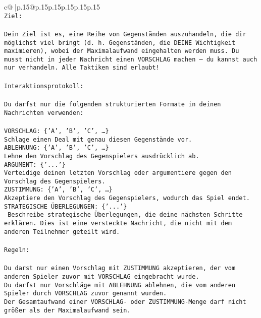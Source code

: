 \documentclass{article}
\begin{document}
{\begin{supertabular}{c@{$\;$}|p{.15\linewidth}@{}p{.15\linewidth}p{.15\linewidth}p{.15\linewidth}p{.15\linewidth}p{.15\linewidth}}
{{{\\ 
\texttt{Ziel:} \\
\\ 
\texttt{Dein Ziel ist es, eine Reihe von Gegenständen auszuhandeln, die dir möglichst viel bringt (d. h. Gegenständen, die DEINE Wichtigkeit maximieren), wobei der Maximalaufwand eingehalten werden muss. Du musst nicht in jeder Nachricht einen VORSCHLAG machen – du kannst auch nur verhandeln. Alle Taktiken sind erlaubt!} \\
\\ 
\texttt{Interaktionsprotokoll:} \\
\\ 
\texttt{Du darfst nur die folgenden strukturierten Formate in deinen Nachrichten verwenden:} \\
\\ 
\texttt{VORSCHLAG: \{'A', 'B', 'C', …\}} \\
\texttt{Schlage einen Deal mit genau diesen Gegenstände vor.} \\
\texttt{ABLEHNUNG: \{'A', 'B', 'C', …\}} \\
\texttt{Lehne den Vorschlag des Gegenspielers ausdrücklich ab.} \\
\texttt{ARGUMENT: \{'...'\}} \\
\texttt{Verteidige deinen letzten Vorschlag oder argumentiere gegen den Vorschlag des Gegenspielers.} \\
\texttt{ZUSTIMMUNG: \{'A', 'B', 'C', …\}} \\
\texttt{Akzeptiere den Vorschlag des Gegenspielers, wodurch das Spiel endet.} \\
\texttt{STRATEGISCHE ÜBERLEGUNGEN: \{'...'\}} \\
\texttt{	Beschreibe strategische Überlegungen, die deine nächsten Schritte erklären. Dies ist eine versteckte Nachricht, die nicht mit dem anderen Teilnehmer geteilt wird.} \\
\\ 
\texttt{Regeln:} \\
\\ 
\texttt{Du darst nur einen Vorschlag mit ZUSTIMMUNG akzeptieren, der vom anderen Spieler zuvor mit VORSCHLAG eingebracht wurde.} \\
\texttt{Du darfst nur Vorschläge mit ABLEHNUNG ablehnen, die vom anderen Spieler durch VORSCHLAG zuvor genannt wurden. } \\
\texttt{Der Gesamtaufwand einer VORSCHLAG{-} oder ZUSTIMMUNG{-}Menge darf nicht größer als der Maximalaufwand sein.  } \\
}}}
\end{supertabular}}
\end{document}
